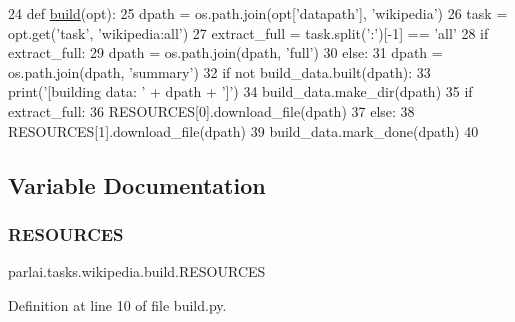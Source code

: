 \begin{DoxyCode}
24 \textcolor{keyword}{def }\hyperlink{namespacedialog__babi__feedback_1_1build_a7a9d289f7493a5ded13c4b7f071b6184}{build}(opt):
25     dpath = os.path.join(opt[\textcolor{stringliteral}{'datapath'}], \textcolor{stringliteral}{'wikipedia'})
26     task = opt.get(\textcolor{stringliteral}{'task'}, \textcolor{stringliteral}{'wikipedia:all'})
27     extract\_full = task.split(\textcolor{stringliteral}{':'})[-1] == \textcolor{stringliteral}{'all'}
28     \textcolor{keywordflow}{if} extract\_full:
29         dpath = os.path.join(dpath, \textcolor{stringliteral}{'full'})
30     \textcolor{keywordflow}{else}:
31         dpath = os.path.join(dpath, \textcolor{stringliteral}{'summary'})
32     \textcolor{keywordflow}{if} \textcolor{keywordflow}{not} build\_data.built(dpath):
33         print(\textcolor{stringliteral}{'[building data: '} + dpath + \textcolor{stringliteral}{']'})
34         build\_data.make\_dir(dpath)
35         \textcolor{keywordflow}{if} extract\_full:
36             RESOURCES[0].download\_file(dpath)
37         \textcolor{keywordflow}{else}:
38             RESOURCES[1].download\_file(dpath)
39         build\_data.mark\_done(dpath)
40 \end{DoxyCode}


\subsection{Variable Documentation}
\mbox{\label{namespaceparlai_1_1tasks_1_1wikipedia_1_1build_a472bb7e75c19f0b2d1969fca17a86669}} 
\subsubsection{\texorpdfstring{R\+E\+S\+O\+U\+R\+C\+ES}{RESOURCES}}
{\footnotesize\ttfamily parlai.\+tasks.\+wikipedia.\+build.\+R\+E\+S\+O\+U\+R\+C\+ES}



Definition at line 10 of file build.\+py.

